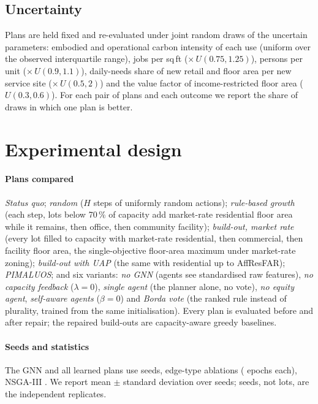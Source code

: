 \documentclass[preprint,12pt]{elsarticle}
\begin{document}
\subsection{Uncertainty}
Plans are held fixed and re-evaluated under \NUncDraws{} joint random draws of the uncertain parameters: embodied and operational carbon intensity of each use (uniform over the observed interquartile range), jobs per sq\,ft ($\times\,U(0.75,1.25)$), persons per unit ($\times\,U(0.9,1.1)$), daily-needs share of new retail and floor area per new service site ($\times\,U(0.5,2)$) and the value factor of income-restricted floor area ($U(0.3,0.6)$). For each pair of plans and each outcome we report the share of draws in which one plan is better.

\section{Experimental design}

\paragraph{Plans compared} \emph{Status quo}; \emph{random} ($H$ steps of uniformly random actions); \emph{rule-based growth} (each step, lots below 70\,\% of capacity add market-rate residential floor area while it remains, then office, then community facility); \emph{build-out, market rate} (every lot filled to capacity with market-rate residential, then commercial, then facility floor area, the single-objective floor-area maximum under market-rate zoning); \emph{build-out with UAP} (the same with residential up to AffResFAR); \emph{PIMALUOS}; and six variants: \emph{no GNN} (agents see standardised raw features), \emph{no capacity feedback} ($\lambda=0$), \emph{single agent} (the planner alone, no vote), \emph{no equity agent}, \emph{self-aware agents} ($\beta=0$) and \emph{Borda vote} (the ranked rule instead of plurality, trained from the same initialisation). Every plan is evaluated before and after repair; the repaired build-outs are capacity-aware greedy baselines.

\paragraph{Seeds and statistics} The GNN and all learned plans use \NSeeds{} seeds, edge-type ablations \NSeedsAbl{} (\AblEpochs{} epochs each), NSGA-III \NSeedsPareto{}. We report mean $\pm$ standard deviation over seeds; seeds, not lots, are the independent replicates.
\end{document}
